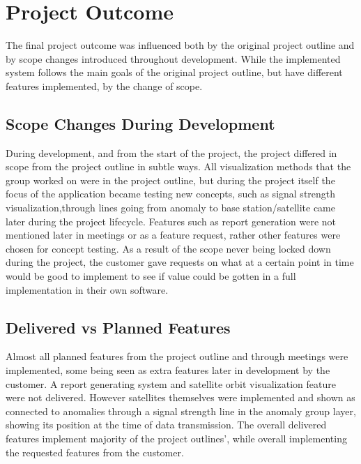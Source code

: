 \section{Project Outcome}

The final project outcome was influenced both by the original project outline and by scope changes introduced throughout development. While the implemented system follows the main goals of the original project outline, but have different features implemented, by the change of scope. 

\subsection{Scope Changes During Development}

During development, and from the start of the project, the project differed in scope from the project outline in subtle ways. All visualization methods that the group worked on were in the project outline, but during the project itself the focus of the application became testing new concepts, such as signal strength visualization,through lines going from anomaly to base station/satellite came later during the project lifecycle. Features such as report generation were not mentioned later in meetings or as a feature request, rather other features were chosen for concept testing. As a result of the scope never being locked down during the project, the customer gave requests on what at a certain point in time would be good to implement to see if value could be gotten in a full implementation in their own software. 

\subsection{Delivered vs Planned Features}

Almost all planned features from the project outline and through meetings were implemented, some being seen as extra features later in development by the customer. A report generating system and satellite orbit visualization feature were not delivered. However satellites themselves were implemented and shown as connected to anomalies through a signal strength line in the anomaly group layer, showing its position at the time of data transmission. The overall delivered features implement majority of the project outlines', while overall implementing the requested features from the customer. 

